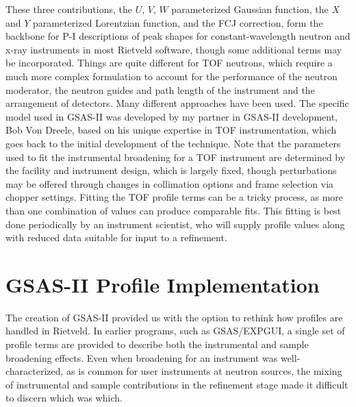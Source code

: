  These three contributions, the $U$, $V$, $W$ parameterized Gaussian function, the $X$ and $Y$ parameterized Lorentzian function, and the FCJ correction, form the backbone for P-I descriptions of peak shapes for constant-wavelength neutron and x-ray instruments in most Rietveld software, though some additional terms may be incorporated. 
 Things are quite different for TOF neutrons, which require a much more complex formulation to account for the performance of the neutron moderator, the neutron guides and path length of the instrument and the arrangement of detectors. Many different approaches have been used. The specific model used in GSAS-II was developed by my partner in GSAS-II development, Bob Von Dreele, based on his unique expertise in TOF instrumentation, which goes back to the initial development of the technique. Note that the parameters used to fit the instrumental broadening for a TOF instrument are determined by the facility and instrument design, which is largely fixed, though perturbations may be offered through changes in collimation options and frame selection via chopper settings. Fitting the TOF profile terms can be a tricky process, as more than one combination of values can produce comparable fits. This fitting is best done periodically by an instrument scientist, who will supply profile values along with reduced data suitable for input to a refinement. 
 
\section{GSAS-II Profile Implementation}

The creation of GSAS-II provided us with the option to rethink how profiles are handled in Rietveld. In earlier programs, such as GSAS/EXPGUI, a single set of profile terms are provided to describe both the instrumental and sample broadening effects. Even when broadening for an instrument was well-characterized, as is common for user instruments at neutron sources, the mixing of instrumental and sample contributions in the refinement stage made it difficult to discern which was which. 

